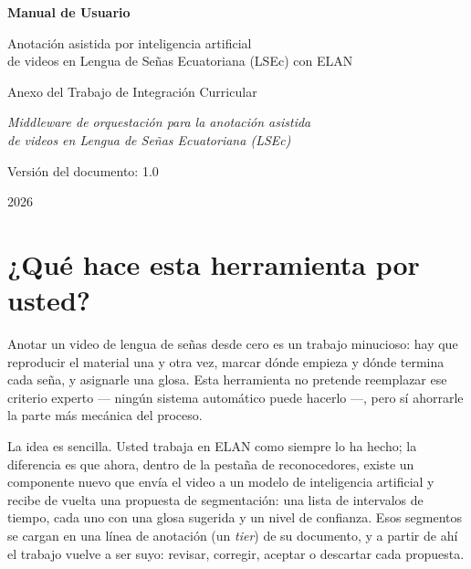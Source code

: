 \documentclass[12pt,a4paper]{article}
\begin{document}
\begin{titlepage}
\centering
\vspace*{3cm}
{\LARGE \textbf{Manual de Usuario}\par}
\vspace{0.6cm}
{\Large Anotación asistida por inteligencia artificial\\
de videos en Lengua de Señas Ecuatoriana (LSEc) con ELAN\par}
\vspace{2cm}
{\large Anexo del Trabajo de Integración Curricular\par}
\vspace{0.4cm}
{\large \textit{Middleware de orquestación para la anotación asistida\\
de videos en Lengua de Señas Ecuatoriana (LSEc)}\par}
\vfill
{\large Versión del documento: 1.0\par}
\vspace{0.3cm}
{\large 2026\par}
\end{titlepage}

\tableofcontents
\newpage

\section{¿Qué hace esta herramienta por usted?}

Anotar un video de lengua de señas desde cero es un trabajo minucioso: hay que reproducir el material una y otra vez, marcar dónde empieza y dónde termina cada seña, y asignarle una glosa. Esta herramienta no pretende reemplazar ese criterio experto --- ningún sistema automático puede hacerlo ---, pero sí ahorrarle la parte más mecánica del proceso.

La idea es sencilla. Usted trabaja en ELAN como siempre lo ha hecho; la diferencia es que ahora, dentro de la pestaña de reconocedores, existe un componente nuevo que envía el video a un modelo de inteligencia artificial y recibe de vuelta una propuesta de segmentación: una lista de intervalos de tiempo, cada uno con una glosa sugerida y un nivel de confianza. Esos segmentos se cargan en una línea de anotación (un \textit{tier}) de su documento, y a partir de ahí el trabajo vuelve a ser suyo: revisar, corregir, aceptar o descartar cada propuesta.
\end{document}
